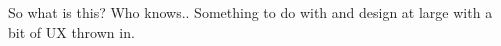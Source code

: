 
So what is this? Who knows..
Something to do with {\Shotgun} and design at large with a bit of UX thrown in.
